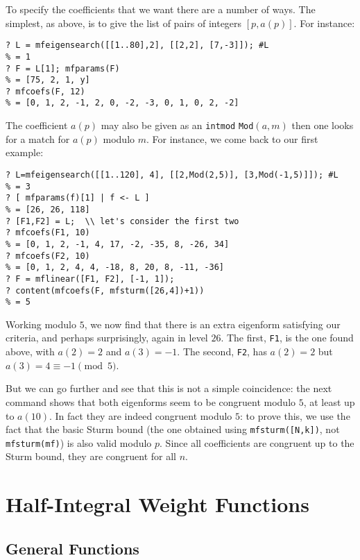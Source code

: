 \documentclass[11pt]{article}
\def\kbd#1{{\tt #1}}
\begin{document}
To specify the coefficients that we want there are a number of ways. The
simplest, as above, is to give the list of pairs of integers $[p,a(p)]$.
For instance:

\begin{verbatim}
? L = mfeigensearch([[1..80],2], [[2,2], [7,-3]]); #L
% = 1
? F = L[1]; mfparams(F)
% = [75, 2, 1, y]
? mfcoefs(F, 12)
% = [0, 1, 2, -1, 2, 0, -2, -3, 0, 1, 0, 2, -2]
\end{verbatim}

The coefficient $a(p)$ may also be given as an \kbd{intmod} \kbd{Mod}$(a,m)$
then one looks for a match for $a(p)$ modulo $m$. For instance, we come
back to our first example:
\begin{verbatim}
? L=mfeigensearch([[1..120], 4], [[2,Mod(2,5)], [3,Mod(-1,5)]]); #L
% = 3
? [ mfparams(f)[1] | f <- L ]
% = [26, 26, 118]
? [F1,F2] = L;  \\ let's consider the first two
? mfcoefs(F1, 10)
% = [0, 1, 2, -1, 4, 17, -2, -35, 8, -26, 34]
? mfcoefs(F2, 10)
% = [0, 1, 2, 4, 4, -18, 8, 20, 8, -11, -36]
? F = mflinear([F1, F2], [-1, 1]);
? content(mfcoefs(F, mfsturm([26,4])+1))
% = 5
\end{verbatim}

Working modulo $5$, we now find that there is an extra eigenform satisfying
our criteria, and perhaps surprisingly, again in level $26$. The first,
\kbd{F1}, is the one found above, with $a(2)=2$ and $a(3)=-1$. The second,
\kbd{F2}, has $a(2)=2$ but $a(3)=4\equiv-1\pmod5$.

But we can go further and see that this is not a simple coincidence:
the next command shows that both eigenforms seem to be congruent modulo $5$,
at least up to $a(10)$. In fact they are indeed congruent modulo $5$:
to prove this, we use the fact that the basic Sturm bound (the one obtained
using \kbd{mfsturm([N,k])}, not \kbd{mfsturm(mf)}) is also valid modulo $p$.
Since all coefficients are congruent up to the Sturm bound, they are
congruent for all $n$.

\section{Half-Integral Weight Functions}

\subsection{General Functions}
\end{document}
